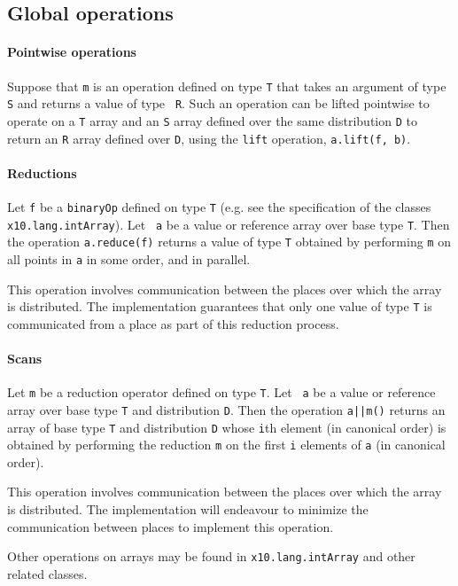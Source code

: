 \subsection{Global operations }
\paragraph{Pointwise operations}\label{ArrayPointwise}
Suppose that {\tt m} is an operation defined on type {\tt T} that
takes an argument of type {\tt S} and returns a value of type {\tt
R}. Such an operation can be lifted pointwise to operate on a {\tt T}
array and an {\tt S} array defined over the same distribution {\tt D}
to return an {\tt R} array defined over {\tt D}, using the
{\tt lift} operation, {\tt a.lift(f, b)}.


\paragraph{Reductions}\label{ArrayReductions}

Let {\tt f} be a {\tt binaryOp} defined on type {\tt T} (e.g.{} see
the specification of the classes {\tt x10.lang.intArray}).  Let {\tt
a} be a value or reference array over base type {\tt T}. Then the
operation {\tt a.reduce(f)} returns a value of type {\tt T} obtained
by performing {\tt m} on all points in {\tt a} in some order, and in
parallel.

This operation involves communication between the places over which
the array is distributed. The \Xten{} implementation guarantees that
only one value of type {\tt T} is communicated from a place as part of
this reduction process.

\paragraph{Scans}\label{ArrayScans}

Let {\tt m} be a reduction operator defined on type {\tt T}. Let {\tt
a} be a value or reference array over base type {\tt T} and
distribution {\tt D}. Then the operation {\tt a||m()} returns an array
of base type {\tt T} and distribution {\tt D} whose {\tt i}th element
(in canonical order) is obtained by performing the reduction {\tt m}
on the first {\tt i} elements of {\tt a} (in canonical order).

This operation involves communication between the places over which
the array is distributed. The \Xten{} implementation will endeavour to
minimize the communication between places to implement this operation.


Other operations on arrays may be found in 
{\tt x10.lang.intArray} and other related classes.